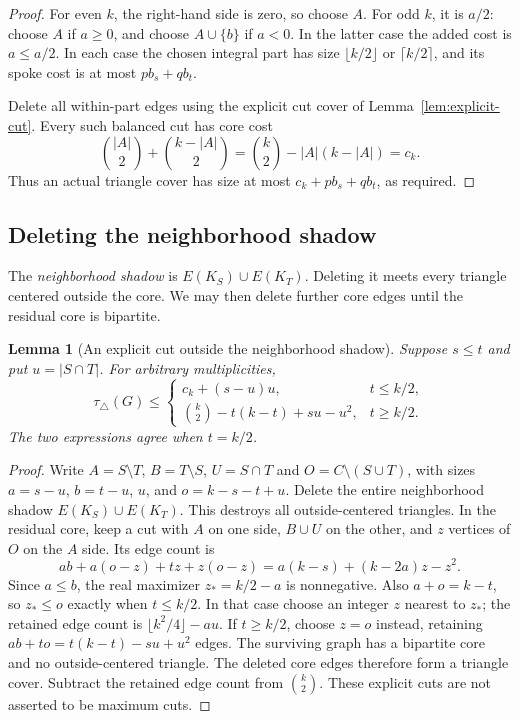 \documentclass[11pt]{article}
\newtheorem{lemma}[theorem]{Lemma}
\newcommand{\tc}{\tau_{\triangle}}
\begin{document}
\begin{proof}
For even $k$, the right-hand side is zero, so choose $A$.
For odd $k$, it is $a/2$: choose $A$ if $a\geq0$, and choose
$A\cup\{b\}$ if $a<0$. In the latter case the added cost is
$a\leq a/2$. In each case the chosen integral part has size
$\lfloor k/2\rfloor$ or $\lceil k/2\rceil$, and its spoke cost is
at most $p b_s+q b_t$.

Delete all within-part edges using the explicit cut cover of
Lemma~\ref{lem:explicit-cut}. Every such balanced cut has core cost
\[
 \binom{|A|}{2}+\binom{k-|A|}{2}
 =\binom k2-|A|(k-|A|)=c_k.
\]
Thus an actual triangle cover has size at most $c_k+p b_s+q b_t$,
as required.
\end{proof}



\subsection{Deleting the neighborhood shadow}
The \emph{neighborhood shadow} is $E(K_S)\cup E(K_T)$.
Deleting it meets every triangle centered outside the core. We may
then delete further core edges until the residual core is bipartite.

\begin{lemma}[An explicit cut outside the neighborhood shadow]
\label{lem:unequal-shadow}
Suppose $s\leq t$ and put $u=|S\cap T|$. For arbitrary multiplicities,
\[
 \tc(G)\leq
 \begin{cases}
 c_k+(s-u)u,&t\leq k/2,\\
 \binom k2-t(k-t)+su-u^2,&t\geq k/2.
 \end{cases}
\]
The two expressions agree when $t=k/2$.
\end{lemma}
\begin{proof}
Write $A=S\setminus T$, $B=T\setminus S$, $U=S\cap T$ and
$O=C\setminus(S\cup T)$, with sizes $a=s-u$, $b=t-u$, $u$, and
$o=k-s-t+u$. Delete the entire neighborhood shadow
$E(K_S)\cup E(K_T)$. This destroys all outside-centered triangles.
In the residual core, keep a cut with $A$ on one side, $B\cup U$
on the other, and $z$ vertices of $O$ on the $A$ side. Its edge count is
\[
 ab+a(o-z)+tz+z(o-z)
 =a(k-s)+(k-2a)z-z^2.
\]
Since $a\leq b$, the real maximizer $z_*=k/2-a$ is nonnegative.
Also $a+o=k-t$, so $z_*\leq o$ exactly when $t\leq k/2$.
In that case choose an integer $z$ nearest to $z_*$; the retained
edge count is $\lfloor k^2/4\rfloor-au$. If $t\geq k/2$, choose
$z=o$ instead, retaining $ab+to=t(k-t)-su+u^2$ edges.
The surviving graph has a bipartite core and no outside-centered
triangle. The deleted core edges therefore form a triangle cover.
Subtract the retained edge count from $\binom k2$.
These explicit cuts are not asserted to be maximum cuts.
\end{proof}
\end{document}
